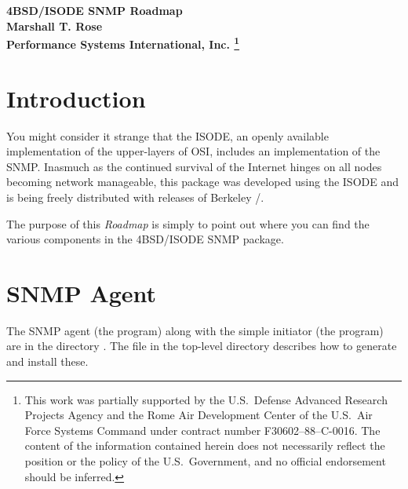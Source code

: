 





\begin{center}\Large\bf
4BSD/ISODE SNMP Roadmap\\[0.25in]
\normalsize\bf Marshall T. Rose\\ Performance Systems International, Inc.%
\footnote{This work was partially supported by the U.S.~Defense Advanced
Research Projects Agency and the Rome Air Development Center of the U.S.~Air
Force Systems Command under contract number F30602--88--C-0016.
The content of the information contained herein does not necessarily reflect
the position or the policy of the U.S.~Government,
and no official endorsement should be inferred.}
\end{center}

\section*	{Introduction}
You might consider it strange that the ISODE,
an openly available implementation of the upper-layers of OSI,
includes an implementation of the SNMP.
Inasmuch as the continued survival of the Internet hinges on all nodes
becoming network manageable,
this package was developed using the ISODE and is being freely
distributed with releases of Berkeley \unix/.

The purpose of this {\em Roadmap} is simply to point out where you can find
the various components in the 4BSD/ISODE SNMP package.

\section*	{SNMP Agent}
The SNMP agent (the  program) along with the simple initiator
(the  program) are in the directory .
The  file in the top-level directory describes how to generate
and install these.

